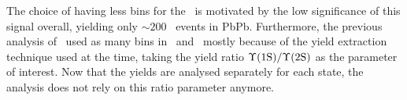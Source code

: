 The choice of having less bins for the \PgUb\ is motivated by the low
significance of this signal overall, yielding only $\sim 200$ \PgUb\
events in PbPb. Furthermore, the previous
analysis of \PgUb\ used as many bins in \PgUb\ and \PgUa\ mostly
because of the yield extraction technique used at the time, taking
the yield ratio $\Upsilon\mathrm{(1S)} / \Upsilon\mathrm{(2S)}$ as the parameter of interest. Now
that the yields are analysed separately for each state, the analysis
does not rely on this ratio parameter anymore.







